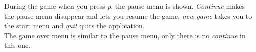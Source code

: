   During the game when you press \emph{p}, the pause menu is shown. \emph{Continue} makes the pause menu disappear and lets you resume the game, \emph{new game} takes you to the start menu and \emph{quit} quits the application.\\

  The game over menu is similar to the pause menu, only there is no \emph{continue} in this one. 

